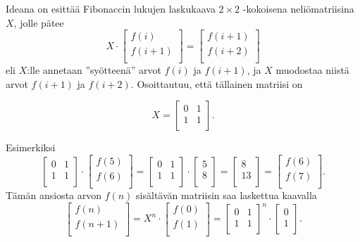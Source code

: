 \begin{samepage}
Ideana on esittää Fibonaccin lukujen laskukaava
$2 \times 2$ -kokoisena neliömatriisina
$X$, jolle pätee
\[ X \cdot
 \begin{bmatrix}
  f(i) \\
  f(i+1) \\
 \end{bmatrix}
=
 \begin{bmatrix}
  f(i+1) \\
  f(i+2) \\
 \end{bmatrix}
 \]
eli $X$:lle annetaan
''syötteenä'' arvot $f(i)$ ja $f(i+1)$,
ja $X$ muodostaa niistä
arvot $f(i+1)$ ja $f(i+2)$.
Osoittautuu, että tällainen matriisi on

\[ X = 
 \begin{bmatrix}
  0 & 1 \\
  1 & 1 \\
 \end{bmatrix}.
\]
\end{samepage}
\noindent
Esimerkiksi
\[
 \begin{bmatrix}
  0 & 1 \\
  1 & 1 \\
 \end{bmatrix}
\cdot
 \begin{bmatrix}
  f(5) \\
  f(6) \\
 \end{bmatrix}
=
 \begin{bmatrix}
  0 & 1 \\
  1 & 1 \\
 \end{bmatrix}
\cdot
 \begin{bmatrix}
  5 \\
  8 \\
 \end{bmatrix}
=
 \begin{bmatrix}
  8 \\
  13 \\
 \end{bmatrix}
=
 \begin{bmatrix}
  f(6) \\
  f(7) \\
 \end{bmatrix}.
\]
Tämän ansiosta arvon $f(n)$ sisältävän matriisin saa laskettua
kaavalla
\[
 \begin{bmatrix}
  f(n) \\
  f(n+1) \\
 \end{bmatrix}
=
X^n \cdot
 \begin{bmatrix}
  f(0) \\
  f(1) \\
 \end{bmatrix}
=
 \begin{bmatrix}
  0 & 1 \\
  1 & 1 \\
 \end{bmatrix}^n
\cdot
 \begin{bmatrix}
  0 \\
  1 \\
 \end{bmatrix}.
\]
